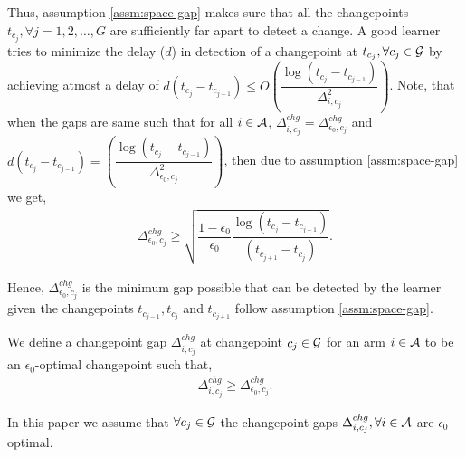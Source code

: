 \begin{discussion}
\label{dis:gap-delay}
Thus, assumption \ref{assm:space-gap} makes sure that all the changepoints $t_{c_j},\forall j=1,2,\ldots,G$ are sufficiently far apart to detect a change. A good learner tries to minimize the delay ($d$) in detection of a changepoint at $t_{c_j},\forall c_{j}\in\mathcal{G}$ by achieving atmost a delay of $d\left(t_{c_j} - t_{c_{j-1}}\right) \leq O\left( \dfrac{\log( t_{c_j} - t_{c_{j-1}} )}{\Delta_{i,c_j}^{2}}\right)$. Note, that when the gaps are same such that for all $i\in\mathcal{A}$, $\Delta_{i,c_j}^{chg}=\Delta_{\epsilon_0,c_j}^{chg}$ and $d\left(t_{c_j} - t_{c_{j-1}}\right) = \left( \dfrac{\log( t_{c_j} - t_{c_{j-1}} )}{\Delta_{\epsilon_0,c_j}^{2}}\right)$, then due to assumption \ref{assm:space-gap} we get,
\begin{align*}
\Delta_{\epsilon_0,c_j}^{chg}\geq \sqrt{\dfrac{1-\epsilon_0}{\epsilon_0}\dfrac{\log(t_{c_j} - t_{c_{j-1}})}{(t_{c_{j+1}} - t_{c_{j}})}}.
\end{align*} 

Hence, $\Delta_{\epsilon_0,c_j}^{chg}$ is the minimum gap possible that can be detected by the learner given the changepoints $t_{c_{j-1}}, t_{c_j}$ and $t_{c_{j+1}}$ follow assumption \ref{assm:space-gap}.

\end{discussion}



\begin{definition}
\label{Def:e-chg-gap}
We define a changepoint gap $\Delta^{chg}_{i,c_j}$ at changepoint $c_j\in\mathcal{G}$ for an arm $i\in\mathcal{A}$ to be an $\epsilon_0$-optimal changepoint such that,
\begin{align*}
\Delta^{chg}_{i,c_j} \geq \Delta_{\epsilon_0,c_j}^{chg}.
\end{align*}
\end{definition}


\begin{assumption}
\label{assm:chg-gap}
In this paper we assume that $\forall c_{j}\in\mathcal{G}$ the changepoint gaps $\Delta^{chg}_{i,c_j},\forall i\in\mathcal{A}$ are $\epsilon_0$-optimal.
\end{assumption}


